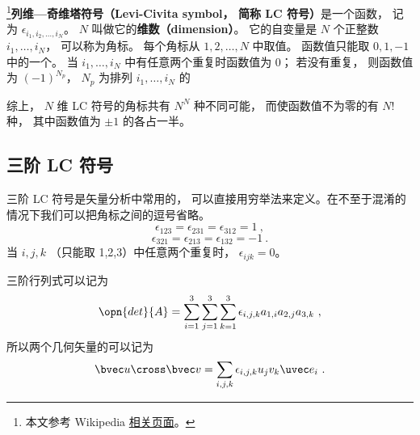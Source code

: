 

\footnote{本文参考 Wikipedia \href{https://en.wikipedia.org/wiki/Levi-Civita_symbol}{相关页面}。}\textbf{列维—奇维塔符号（Levi-Civita symbol， 简称 LC 符号）}是一个函数， 记为 $\epsilon_{i_1, i_2, \dots, i_N}$。 $N$ 叫做它的\textbf{维数（dimension）}。 它的自变量是 $N$ 个正整数 $i_1, \dots, i_N$， 可以称为角标。 每个角标从 $1, 2, \dots, N$ 中取值。 函数值只能取 $0, 1, -1$ 中的一个。 当 $i_1, \dots, i_N$ 中有任意两个重复时函数值为 0； 若没有重复， 则函数值为 $(-1)^{N_p}$， $N_p$ 为排列 $i_1, \dots, i_N$ 的

综上， $N$ 维 LC 符号的角标共有 $N^N$ 种不同可能， 而使函数值不为零的有 $N!$ 种， 其中函数值为 $\pm 1$ 的各占一半。

\subsection{三阶 LC 符号}
三阶 LC 符号是矢量分析中常用的， 可以直接用穷举法来定义。在不至于混淆的情况下我们可以把角标之间的逗号省略。
\begin{equation}
\epsilon_{123} = \epsilon_{231} = \epsilon_{312} = 1~,
\end{equation}
\begin{equation}
\epsilon_{321} = \epsilon_{213} = \epsilon_{132} = -1~.
\end{equation}
当 $i,j,k$ （只能取 1,2,3）中任意两个重复时， $\epsilon_{ijk} = 0$。

三阶行列式可以记为
\begin{equation}
\opn{det}{A} = \sum_{i = 1}^3 \sum_{j = 1}^3 \sum_{k = 1}^3 \epsilon_{i,j,k} a_{1,i} a_{2,j} a_{3,k}~,
\end{equation}
所以两个几何矢量的可以记为
\begin{equation}
\bvec u \cross \bvec v = \sum_{i,j,k} \epsilon_{i,j,k} u_j v_k \uvec e_i~.
\end{equation}
